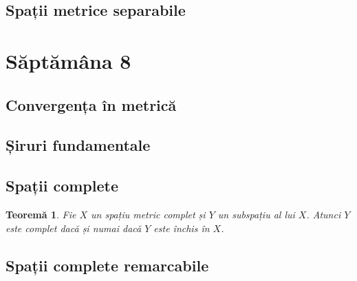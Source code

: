 \documentclass[a4paper,12pt]{article}
\theoremstyle{change}
\newtheorem{theorem}{Teoremă}[section]
\begin{document}
\subsection{Spații metrice separabile}

\section{Săptămâna 8}


\subsection{Convergența în metrică}

\subsection{Șiruri fundamentale}


\subsection{Spații complete}

\begin{theorem}\label{thm:subspatiu-complet}
Fie $X$ un spațiu metric complet și $Y$ un subspațiu al lui $X$. Atunci $Y$ este complet dacă și numai dacă $Y$ este închis în $X$.
\end{theorem}

\subsection{Spații complete remarcabile}
\end{document}
